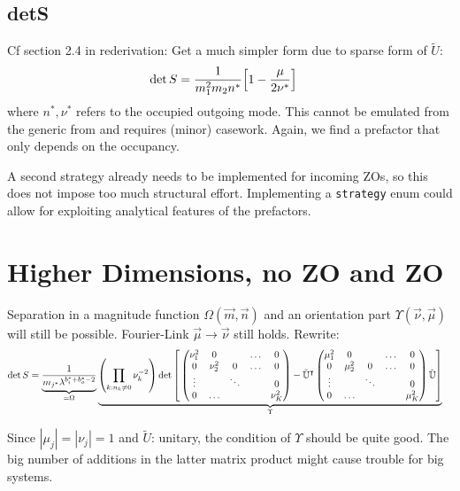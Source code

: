 \documentclass[
	english,
	a4paper,
	fontsize=10pt,
	parskip=half,
	titlepage=true,
	DIV=12,
	final
]{scrreprt}
\newcommand*{\transp}{\ensuremath{^\intercal}}
\begin{document}
\subsection{detS}
Cf section 2.4 in rederivation: Get a much simpler form due to sparse form of $\tilde{U}$:
\begin{align}
	\det S
&=
	\frac{1}{m_1^2 m_2 n^*}
	\qty[
		1 - \frac{\mu}{2\nu^*}
	]
\end{align}
where $n^*, \nu^*$ refers to the occupied outgoing mode. This cannot be emulated from the generic from and requires (minor) casework. Again, we find a prefactor that only depends on the occupancy.

A second strategy already needs to be implemented for incoming ZOs, so this does not impose too much structural effort. Implementing a \texttt{strategy} enum could allow for exploiting analytical features of the prefactors.

\section{Higher Dimensions, no ZO and ZO}
Separation in a magnitude function $\Omega(\vec{m}, \vec{n})$ and an orientation part $\Upsilon(\vec{\nu}, \vec{\mu})$ will still be possible. Fourier-Link $\vec{\mu} \to \vec{\nu}$ still holds.
Rewrite:
\begin{align}
	\det S
&=
	\underbrace{
		\frac{ 1 }{ m_{j^*} \lambda^{b_i^* + b_o^* - 2} }
	}_{=\Omega}
	\underbrace{
	\qty( \prod_{k: n_k \neq 0} \nu_k^{-2} )
	\det\qty[\bigg.
		\begin{pmatrix}
			\nu_1^2 & 0 && \ldots  & 0 \\
			0 & \nu_2^2 & 0 & \ldots & 0 \\
			\vdots & & \ddots & & 0 \\
			0 & \ldots &&& \nu_K^2
		\end{pmatrix}
		-
		\tilde{\mathbb{U}}\transp
		\begin{pmatrix}
			\mu_1^2 & 0 && \ldots  & 0 \\
			0 & \mu_2^2 & 0 & \ldots & 0 \\
			\vdots & & \ddots & & 0 \\
			0 & \ldots &&& \mu_K^2
		\end{pmatrix}
		\tilde{\mathbb{U}}
	]
	}_{\Upsilon}
\end{align}

Since $|\mu_j| = |\nu_j| = 1$ and $\tilde{U}$: unitary, the condition of $\Upsilon$ should be quite good. The big number of additions in the latter matrix product might cause trouble for big systems.
\end{document}
